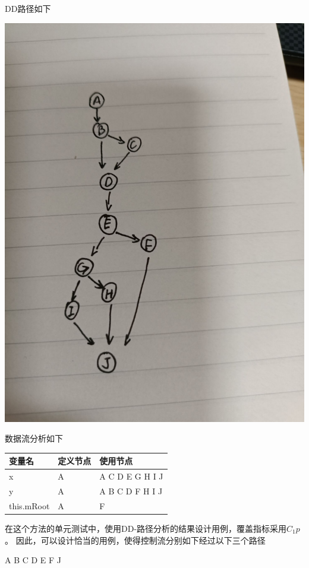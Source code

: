 \documentclass[12pt, a4paper, oneside]{ctexart}
\begin{document}
DD路径如下

\includegraphics[scale=0.2]{screenshots/DD-leftRotate.jpg}

数据流分析如下

\begin{table}[!h]
    \begin{tabular}{|l|l|l|}
    \hline
    变量名 & 定义节点 & 使用节点 \\ \hline
    x & A & A C D E G H I J\\ \hline
    y & A & A B C D F H I J \\ \hline
    this.mRoot & A & F \\ \hline
    \end{tabular}
\end{table}

在这个方法的单元测试中，使用DD-路径分析的结果设计用例，覆盖指标采用$C_1p$。
因此，可以设计恰当的用例，使得控制流分别如下经过以下三个路径

A B C D E F J
\end{document}
